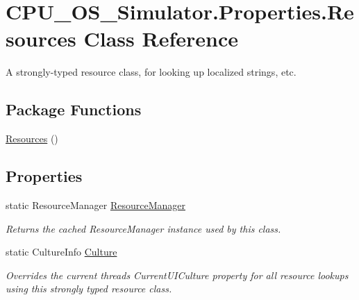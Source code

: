 \hypertarget{class_c_p_u___o_s___simulator_1_1_properties_1_1_resources}{}\section{C\+P\+U\+\_\+\+O\+S\+\_\+\+Simulator.\+Properties.\+Resources Class Reference}
\label{class_c_p_u___o_s___simulator_1_1_properties_1_1_resources}


A strongly-\/typed resource class, for looking up localized strings, etc.  


\subsection*{Package Functions}
\begin{DoxyCompactItemize}
\item 
\hyperlink{class_c_p_u___o_s___simulator_1_1_properties_1_1_resources_ae830a892b90306383137816b2194f777}{Resources} ()
\end{DoxyCompactItemize}
\subsection*{Properties}
\begin{DoxyCompactItemize}
\item 
static Resource\+Manager \hyperlink{class_c_p_u___o_s___simulator_1_1_properties_1_1_resources_ab94d8d323ea515d9785b46e3824d8767}{Resource\+Manager}
\begin{DoxyCompactList}\small\item\em Returns the cached Resource\+Manager instance used by this class. \end{DoxyCompactList}\item 
static Culture\+Info \hyperlink{class_c_p_u___o_s___simulator_1_1_properties_1_1_resources_aa592510b1ffdc479eca72adae099ab05}{Culture}
\begin{DoxyCompactList}\small\item\em Overrides the current thread\textquotesingle{}s Current\+U\+I\+Culture property for all resource lookups using this strongly typed resource class. \end{DoxyCompactList}\end{DoxyCompactItemize}
